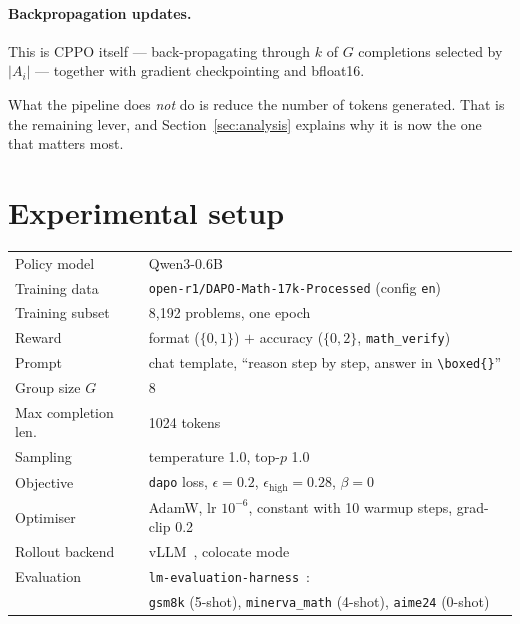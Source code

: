 \documentclass[11pt,a4paper]{article}
\newcommand{\Adv}{A}
\begin{document}
\paragraph{Backpropagation updates.} This is CPPO itself --- back-propagating
through $k$ of $G$ completions selected by $|\Adv_i|$ --- together with
gradient checkpointing and bfloat16.

What the pipeline does \emph{not} do is reduce the number of tokens generated.
That is the remaining lever, and Section~\ref{sec:analysis} explains why it is
now the one that matters most.

\section{Experimental setup}
\label{sec:setup}

\begin{center}
\begin{tabular}{ll}
\toprule
Policy model        & Qwen3-0.6B~\cite{qwen3} \\
Training data       & \texttt{open-r1/DAPO-Math-17k-Processed} (config \texttt{en}) \\
Training subset     & 8{,}192 problems, one epoch \\
Reward              & format ($\{0,1\}$) $+$ accuracy ($\{0,2\}$, \texttt{math\_verify}) \\
Prompt              & chat template, ``reason step by step, answer in \verb|\boxed{}|'' \\
Group size $G$      & 8 \\
Max completion len. & 1024 tokens \\
Sampling            & temperature 1.0, top-$p$ 1.0 \\
Objective           & \texttt{dapo} loss, $\epsilon = 0.2$, $\epsilon_{\mathrm{high}} = 0.28$, $\beta = 0$ \\
Optimiser           & AdamW, lr $10^{-6}$, constant with 10 warmup steps, grad-clip 0.2 \\
Rollout backend     & vLLM~\cite{kwon2023vllm}, colocate mode \\
Evaluation          & \texttt{lm-evaluation-harness}~\cite{eval-harness}: \\
                    & \quad \texttt{gsm8k} (5-shot), \texttt{minerva\_math} (4-shot), \texttt{aime24} (0-shot) \\
\bottomrule
\end{tabular}
\end{center}
\end{document}
